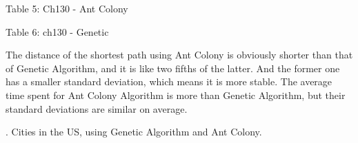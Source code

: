 \documentclass{article}
\begin{document}
\begin{center}
    Table 5: Ch130 - Ant Colony
\end{center}
\begin{center}

\begin{center}
    Table 6: ch130 - Genetic
\end{center}
\end{center}

The distance of the shortest path using Ant Colony is obviously shorter than that of Genetic Algorithm, and it is like two fifths of the latter. And the former one has a smaller standard deviation, which means it is more stable. The average time spent for Ant Colony Algorithm is more than Genetic Algorithm, but their standard deviations are similar on average. 

. Cities in the US, using Genetic Algorithm and Ant Colony. 
\end{document}
